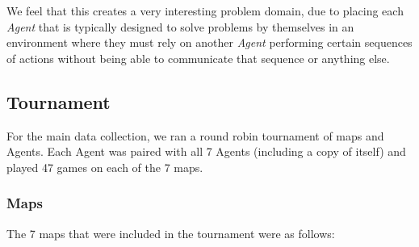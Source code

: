 \documentclass{IEEEtran}
\begin{document}
We feel that this creates a very interesting problem domain, due to placing each \emph{Agent} that is typically designed to solve problems by themselves in an environment where they must rely on another \emph{Agent} performing certain sequences of actions without being able to communicate that sequence or anything else.

\subsection{Tournament}
For the main data collection, we ran a round robin tournament of maps and Agents. Each Agent was paired with all 7 Agents (including a copy of itself) and played 47 games on each of the 7 maps. 

\subsubsection{Maps}
The 7 maps that were included in the tournament were as follows:
\end{document}
